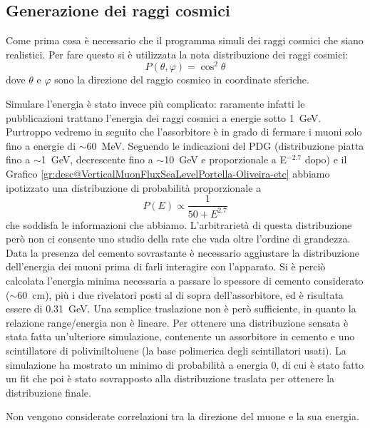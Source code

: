 \subsection{Generazione dei raggi cosmici}
Come prima cosa è necessario che il programma simuli dei raggi cosmici che siano realistici. Per fare questo si è utilizzata la nota distribuzione dei raggi cosmici:
\begin{equation}
	P\left(\theta, \varphi\right) = \cos^2{\theta}
	\label{eq:distr_cosmici}
\end{equation}
dove $\theta$ e $\varphi$ sono la direzione del raggio cosmico in coordinate sferiche.

Simulare l'energia \`e stato invece pi\`u complicato: raramente infatti le pubblicazioni trattano l'energia dei raggi cosmici a energie sotto 1~GeV. Purtroppo vedremo in seguito che l'assorbitore \`e in grado di fermare i muoni solo fino a energie di $\sim $60~MeV. Seguendo le indicazioni del PDG \cite{bib:Patrignani:2016xqp} (distribuzione piatta fino a $\sim $1~GeV, decrescente fino a $\sim $10~GeV e proporzionale a E$^{-2.7}$ dopo) e il Grafico \ref{gr:desc@VerticalMuonFluxSeaLevelPortella-Oliveira-etc} abbiamo ipotizzato una distribuzione di probabilit\`a proporzionale a 
\begin{equation}
	P\left(E\right) \propto \frac{1}{50+E^{2.7}}
	\label{eq:distr_cosmici_en}
\end{equation}
che soddisfa le informazioni che abbiamo. L'arbitrariet\`a di questa distribuzione per\`o non ci consente uno studio della rate che vada oltre l'ordine di grandezza.
Data la presenza del cemento sovrastante \`e necessario aggiustare la distribuzione dell'energia dei muoni prima di farli interagire con l'apparato. Si \`e perci\`o calcolata l'energia minima necessaria a passare lo spessore di cemento considerato ($\sim$60~cm), pi\`u i due rivelatori posti al di sopra dell'assorbitore, ed \`e risultata essere di 0.31~GeV. Una semplice traslazione non \`e per\`o sufficiente, in quanto la relazione range/energia non \`e lineare. Per ottenere una distribuzione sensata \`e stata fatta un'ulteriore simulazione, contenente un assorbitore in cemento e uno scintillatore di poliviniltoluene (la base polimerica degli scintillatori usati). La simulazione ha mostrato un minimo di probabilit\`a a energia 0, di cui \`e stato fatto un fit che poi \`e stato sovrapposto alla distribuzione traslata per ottenere la distribuzione finale.

Non vengono considerate correlazioni tra la direzione del muone e la sua energia.

